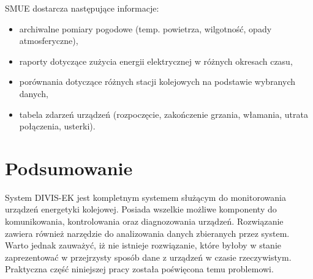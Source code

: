 SMUE dostarcza następujące informacje:
\begin{itemize}
\item archiwalne pomiary pogodowe (temp. powietrza, wilgotność, opady atmosferyczne),
\item raporty dotyczące zużycia energii elektrycznej w różnych okresach czasu,
\item porównania dotyczące różnych stacji kolejowych na podstawie wybranych danych,
\item tabela zdarzeń urządzeń (rozpoczęcie, zakończenie grzania, włamania, utrata połączenia, usterki).
\end{itemize}

\section{Podsumowanie}
System DIVIS-EK jest kompletnym systemem służącym do monitorowania urządzeń energetyki kolejowej. Posiada wszelkie możliwe komponenty do komunikowania, kontrolowania oraz diagnozowania urządzeń. Rozwiązanie zawiera również narzędzie do analizowania danych zbieranych przez system. Warto jednak zauważyć, iż nie istnieje rozwiązanie, które byłoby w stanie zaprezentować w przejrzysty sposób dane z urządzeń w czasie rzeczywistym. Praktyczna część niniejszej pracy została poświęcona temu problemowi.